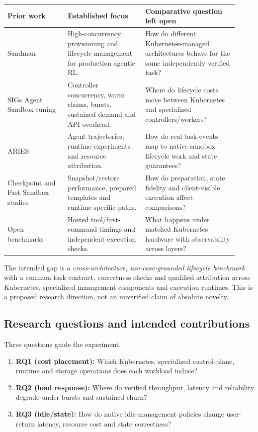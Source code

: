 \documentclass[
  a4paper,
]{article}
\begin{document}
{\small
\begin{longtable}{@{}p{0.24\linewidth}p{0.31\linewidth}p{0.37\linewidth}@{}}
\toprule
Prior work & Established focus & Comparative question left open\\
\midrule
\endhead
\bottomrule
\endlastfoot
Sandman \cite{sandman} &
High-concurrency provisioning and lifecycle
management for production agentic RL. &
How do different Kubernetes-managed architectures
behave for the same independently verified task?\\
SIGs Agent Sandbox tuning \cite{sigTuning} &
Controller concurrency, warm claims,
bursts, sustained demand and API overhead. &
Where do lifecycle costs move between
Kubernetes and specialized controllers/workers?\\
ARIES \cite{ariesPaper,ariesRepo} &
Agent trajectories, runtime experiments
and resource attribution. &
How do real task events map to native
sandbox lifecycle work and state guarantees?\\
Checkpoint and Fast Sandbox studies
\cite{deltaBox,fastPerformance} &
Snapshot/restore performance, prepared
templates and runtime-specific paths. &
How do preparation, state fidelity and
client-visible execution affect comparisons?\\
Open benchmarks
\cite{frigaBenchmark,computeBenchmark} &
Hosted tool/first-command timings and
independent execution checks. &
What happens under matched Kubernetes
hardware with observability across layers?\\
\end{longtable}
}

The intended gap is a \emph{cross-architecture,
use-case-grounded lifecycle benchmark} with a
common task contract, correctness checks and
qualified attribution across Kubernetes,
specialized management components and execution
runtimes. This is a proposed research direction,
not an unverified claim of absolute novelty.

\subsection{Research questions and intended contributions}
Three questions guide the experiment.
\begin{enumerate}
\item \textbf{RQ1 (cost placement):} Which Kubernetes,
specialized control-plane, runtime and storage
operations does each workload induce?
\item \textbf{RQ2 (load response):} Where do
verified throughput, latency and reliability
degrade under bursts and sustained churn?
\item \textbf{RQ3 (idle/state):} How do native
idle-management policies change user-return
latency, resource cost and state correctness?
\end{enumerate}
\end{document}
